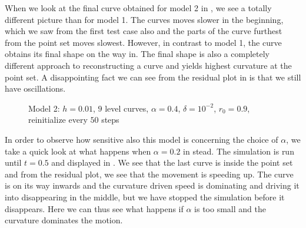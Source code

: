 When we look at the final curve obtained for model 2 in , we see a totally different picture than for model 1. The curves moves slower in the beginning, which we saw from the first test case also and the parts of the curve furthest from the point set moves slowest. However, in contrast to model 1, the curve obtains its final shape on the way in. The final shape is also a completely different approach to reconstructing a curve and yields highest curvature at the point set. A disappointing fact we can see from the residual plot in  is that we still have oscillations.

\begin{figure}
\begin{center}
\end{center}
\vspace{-2.5em}
\caption[Model 2 - Triangle, $\alpha=0.4$]{Model 2: $h=0.01$, $9$ level curves, $\alpha=0.4$, $\delta=10^{-2}$, $r_0=0.9$, reinitialize every $50$ steps}
\label{fig:m2-threepoints-04}
\end{figure}

In order to observe how sensitive also this model is concerning the choice of $\alpha$, we take a quick look at what happens when $\alpha=0.2$ in stead. The simulation is run until $t=0.5$ and displayed in . We see that the last curve is inside the point set and from the residual plot, we see that the movement is speeding up. The curve is on its way inwards and the curvature driven speed is dominating and driving it into disappearing in the middle, but we have stopped the simulation before it disappears. Here we can thus see what happens if $\alpha$ is too small and the curvature dominates the motion. 

